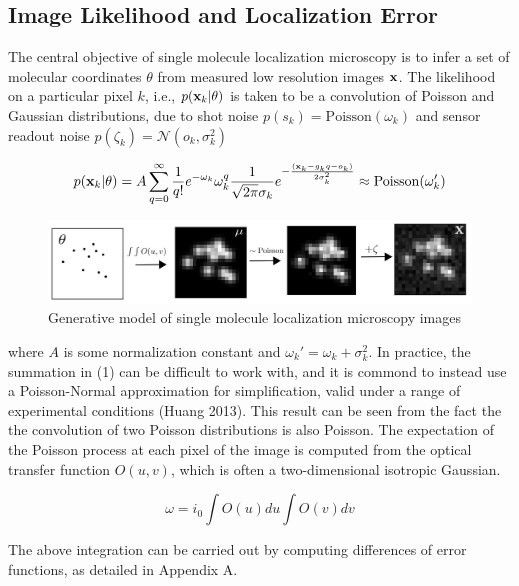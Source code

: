 \documentclass{article}
\begin{document}
\subsection{Image Likelihood and Localization Error}

The central objective of single molecule localization microscopy is to infer a set of molecular coordinates $\theta$ from measured low resolution images $\bold{x}$. The likelihood on a particular pixel $k$, i.e., $p(\bold{x}_k|\theta)$ is taken to be a convolution of Poisson and Gaussian distributions, due to shot noise $p(s_{k}) = \mathrm{Poisson}(\omega_{k})$ and sensor readout noise $p(\zeta_{k}) = \mathcal{N}(o_{k},\sigma_{k}^{2})$ 

\begin{equation}
p(\bold{x}_{k}|\theta) = A\sum_{q=0}^{\infty} \frac{1}{q!}e^{-\omega_{k}}\omega_{k}^{q}\frac{1}{\sqrt{2\pi}\sigma_{k}}e^{-\frac{(\bold{x}_{k}-g_{k}q-o_{k})}{2\sigma_{k}^{2}}} \approx \mathrm{Poisson}(\omega_{k}')
\end{equation}


\begin{figure}
\includegraphics[scale=0.65]{Generation-Figure.png}
\caption{Generative model of single molecule localization microscopy images}
\end{figure}

where $A$ is some normalization constant and $\omega_{k}' = \omega_{k} + \sigma_{k}^{2}$. In practice, the summation in (1) can be difficult to work with, and it is commond to instead use a Poisson-Normal approximation for simplification, valid under a range of experimental conditions (Huang 2013). This result can be seen from the fact the the convolution of two Poisson distributions is also Poisson. The expectation of the Poisson process at each pixel of the image is computed from the optical transfer function $O(u,v)$, which is often a two-dimensional isotropic Gaussian.

\begin{equation}
\omega = i_{0}\int O(u)du\int O(v)dv
\end{equation}

The above integration can be carried out by computing differences of error functions, as detailed in Appendix A. 
\end{document}
